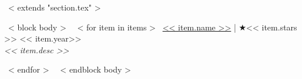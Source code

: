 ~< extends "section.tex" >~

~< block body >~
  ~< for item in items >~
    \href{<< item.repo_url >>}{<< item.name >>} | $\bigstar$<< item.stars >> \hfill
    << item.year>>
    \\ {\scriptsize \color{gray} \emph{<< item.desc >>} }\par \vspace*{0.2cm}
  ~< endfor >~
~< endblock body >~
